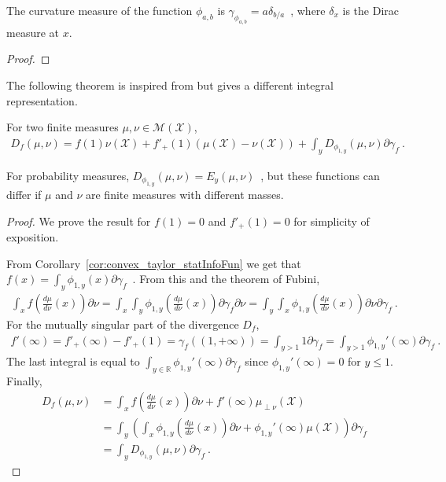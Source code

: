 \begin{lemma}
  \label{lem:curvatureMeasure_statInfoFun}
  The curvature measure of the function $\phi_{a,b}$ is $\gamma_{\phi_{a,b}} = a\delta_{b/a}$~, where $\delta_x$ is the Dirac measure at $x$.
\end{lemma}

\begin{proof}%
\uses{}

\end{proof}

The following theorem is inspired from \cite{liese2006divergences,liese2012phi} but gives a different integral representation.

\begin{theorem}
  \label{thm:fDiv_eq_integral_eGamma}
  For two finite measures $\mu, \nu \in \mathcal M(\mathcal X)$,
  \begin{align*}
  D_f(\mu, \nu) = f(1) \nu(\mathcal X) + f'_+(1)(\mu(\mathcal X) - \nu(\mathcal X)) + \int_y D_{\phi_{1,y}}(\mu, \nu) \partial\gamma_f \: .
  \end{align*}
\end{theorem}

For probability measures, $D_{\phi_{1,y}}(\mu, \nu) = E_y(\mu, \nu)$~, but these functions can differ if $\mu$ and $\nu$ are finite measures with different masses.

\begin{proof}%
{}
We prove the result for $f(1) = 0$ and $f'_+(1) = 0$ for simplicity of exposition.

From Corollary~\ref{cor:convex_taylor_statInfoFun} we get that $f(x) = \int_y \phi_{1,y}(x) \partial\gamma_f$~.
From this and the theorem of Fubini,
\begin{align*}
\int_x f\left( \frac{d \mu}{d \nu}(x) \right) \partial\nu
= \int_{x} \int_{y} \phi_{1,y} \left(\frac{d \mu}{d \nu}(x) \right) \partial\gamma_f \partial\nu
= \int_{y} \int_{x} \phi_{1,y} \left(\frac{d \mu}{d \nu}(x) \right) \partial\nu \partial\gamma_f
\: .
\end{align*}
For the mutually singular part of the divergence $D_f$,
\begin{align*}
f'(\infty)
= f'_+(\infty) - f'_+(1) 
= \gamma_f((1,+\infty))
= \int_{y > 1} 1 \partial \gamma_f
= \int_{y > 1} \phi_{1,y}'(\infty) \partial \gamma_f
\: .
\end{align*}
The last integral is equal to $\int_{y \in \mathbb{R}} \phi_{1,y}'(\infty) \partial \gamma_f$ since $\phi_{1,y}'(\infty) = 0$ for $y \le 1$.
Finally,
\begin{align*}
D_f(\mu, \nu)
&= \int_x f\left( \frac{d \mu}{d \nu}(x) \right) \partial\nu + f'(\infty) \mu_{\perp \nu}(\mathcal X)
\\
&= \int_{y} \left(\int_{x} \phi_{1,y} \left(\frac{d \mu}{d \nu}(x) \right) \partial\nu + \phi_{1,y}'(\infty) \mu(\mathcal X) \right) \partial\gamma_f
\\
&= \int_y D_{\phi_{1,y}}(\mu, \nu) \partial \gamma_f
\: .
\end{align*}
\end{proof}

